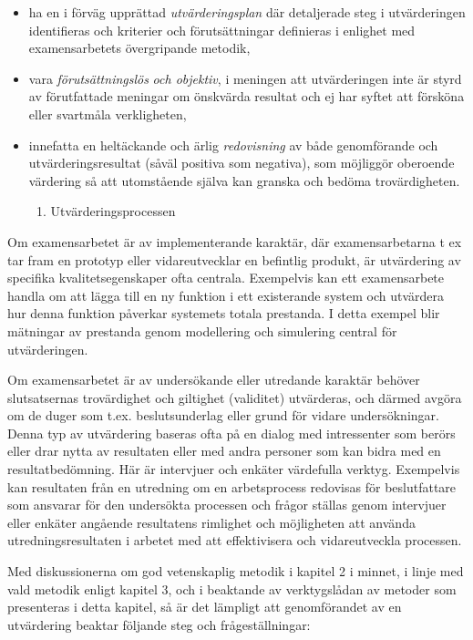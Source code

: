 \begin{itemize}
\item
  ha en i förväg upprättad \emph{utvärderingsplan} där detaljerade steg
  i utvärderingen identifieras och kriterier och förutsättningar
  definieras i enlighet med examensarbetets övergripande metodik,
\item
  vara \emph{förutsättningslös} \emph{och objektiv}, i meningen att
  utvärderingen inte är styrd av förutfattade meningar om önskvärda
  resultat och ej har syftet att försköna eller svartmåla verkligheten,
\item
  innefatta en heltäckande och ärlig \emph{redovisning} av både
  genomförande och utvärderingsresultat (såväl positiva som negativa),
  som möjliggör oberoende värdering så att utomstående själva kan
  granska och bedöma trovärdigheten.

  \begin{enumerate}
  \def\labelenumi{\arabic{enumi}.}
  \item
    Utvärderingsprocessen
  \end{enumerate}
\end{itemize}

Om examensarbetet är av implementerande karaktär, där examensarbetarna t
ex tar fram en prototyp eller vidareutvecklar en befintlig produkt, är
utvärdering av specifika kvalitetsegenskaper ofta centrala. Exempelvis
kan ett examensarbete handla om att lägga till en ny funktion i ett
existerande system och utvärdera hur denna funktion påverkar systemets
totala prestanda. I detta exempel blir mätningar av prestanda genom
modellering och simulering central för utvärderingen.

Om examensarbetet är av undersökande eller utredande karaktär behöver
slutsatsernas trovärdighet och giltighet (validitet) utvärderas, och
därmed avgöra om de duger som t.ex. beslutsunderlag eller grund för
vidare undersökningar. Denna typ av utvärdering baseras ofta på en
dialog med intressenter som berörs eller drar nytta av resultaten eller
med andra personer som kan bidra med en resultatbedömning. Här är
intervjuer och enkäter värdefulla verktyg. Exempelvis kan resultaten
från en utredning om en arbetsprocess redovisas för beslutfattare som
ansvarar för den undersökta processen och frågor ställas genom
intervjuer eller enkäter angående resultatens rimlighet och möjligheten
att använda utredningsresultaten i arbetet med att effektivisera och
vidareutveckla processen.

Med diskussionerna om god vetenskaplig metodik i kapitel 2 i minnet, i
linje med vald metodik enligt kapitel 3, och i beaktande av
verktygslådan av metoder som presenteras i detta kapitel, så är det
lämpligt att genomförandet av en utvärdering beaktar följande steg och
frågeställningar:

